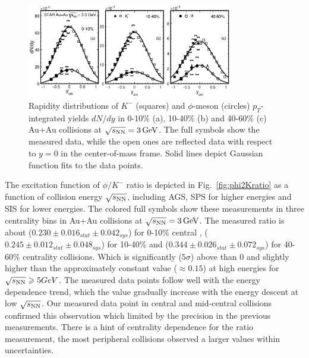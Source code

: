\documentclass[%
 reprint,	
showpacs,
 amsmath,amssymb,
 aps,
 prc,
]{revtex4-1}
\begin{document}
\begin{figure}
\centering
\includegraphics[width=0.8\textwidth]{fig/fig3_dndy.eps}
  \caption{ Rapidity distributions of $K^-$ (squares) and $\phi$-meson (circles) $p_T$-integrated yields $dN/dy$ in 0-10\% (a), 10-40\% (b) and 40-60\% (c) Au+Au collisions at ${\sqrt{s_{\rm NN}} = \rm{3\,GeV}}$. The full symbols show the measured data, while the open ones are reflected data with respect to $y=0$ in the center-of-mass frame. Solid lines depict Gaussian function fits to the data points.}
\label{fig:phiYSpectra} 
\end{figure}


The excitation function of $\phi/K^-$ ratio is depicted in Fig.~\ref{fig:phi2Kratio} as a function of collision energy $\sqrt{s_{\rm NN}}$, including AGS, SPS for higher energies and SIS for lower energies. The colored full symbols show these measurements in three centrality bins in Au+Au collisions at ${\sqrt{s_{\rm NN}} = \rm{3\,GeV}}$. The measured ratio is about ($0.230\pm0.016_{stat}\pm0.042_{sys}$) for 0-10\% central , ($0.245\pm0.012_{stat}\pm0.048_{sys}$) for 10-40\% and ($0.344\pm0.026_{stat}\pm0.072_{sys}$) for 40-60\% centrality collisions. Which is significantly ($5\sigma$) above than 0 and slightly higher than the approximately constant value ($\approx0.15$) at high energies for $\sqrt{s_{\rm NN}}\geqslant 5 GeV$. The measured data points follow well with the energy dependence trend, which the value gradually increase with the energy descent at low $\sqrt{s_{\rm NN}}$. Our measured data point in central and mid-central collisions confirmed this observation which limited by the precision in the previous measurements. There is a hint of centrality dependence for the ratio measurement, the most peripheral collisions observed a larger values within uncertainties.
\end{document}
